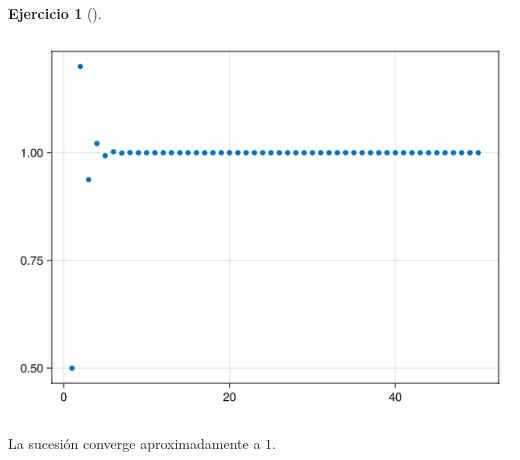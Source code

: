 \documentclass[
  a4paper,
]{scrreport}
\theoremstyle{definition}
\newtheorem{exercise}{Ejercicio}[chapter]
\theoremstyle{remark}
\begin{document}
\begin{exercise}[]
\begin{enumerate}
\begin{tcolorbox}
  \includegraphics{02-sucesiones_files/figure-pdf/cell-16-output-1.png}

  La sucesión converge aproximadamente a \(1\).

  \end{tcolorbox}
\end{enumerate}

\end{exercise}
\end{document}
